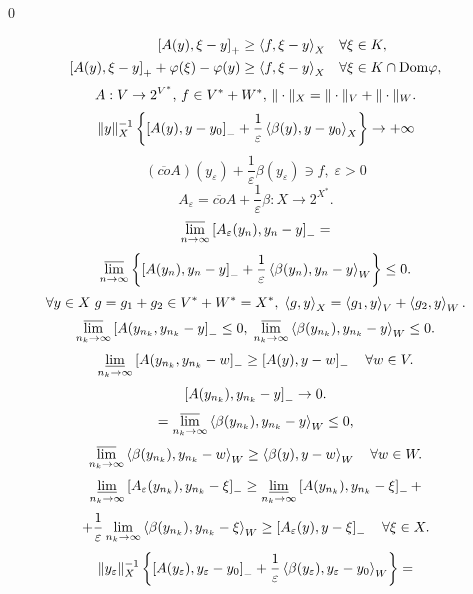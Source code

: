\documentclass[12pt]{book} %
\title{}
\author{}
\newcommand{\Dom}{\mbox{Dom}}
\let\epsilon\varepsilon
\begin{document}
\setcounter{chapter}{2}
\chapter{}
\begin{center}\qed\end{center}
\setcounter{equation}{7}
\begin{align}
	\mysbra{A(y),\xi-y}_+\geq\mysca{f}{\xi-y}_X &\quad\forall\xi\in K,\\
	\mysbra{A(y),\xi-y}_++\phi(\xi)-\phi(y)\geq\mysca{f}{\xi-y}_X &\quad\forall\xi\in K\cap\Dom\phi,
\end{align}
\[A:V\to2^{V^*},\,f\in V^*+W^*,\,\|\cdot\|_X=\|\cdot\|_V+\|\cdot\|_W.\]
\begin{equation}\mynorm{y}_X^{-1}\mycbra{\mysbra{A(y),y-y_0}_-+\frac{1}{\epsilon}\mysca{\beta(y)}{y-y_0}_X}\to+\infty\end{equation}
\begin{equation}(\overline{co}A)(y_\epsilon)+\frac{1}{\epsilon}\beta(y_\epsilon)\ni f,\;\epsilon>0\end{equation}
\[A_\epsilon=\overline{co}A+\frac{1}{\epsilon}\beta:X\to2^{X^*}.\]
\[\varlimsup_{n\to\infty}\mysbra{A_\epsilon(y_n),y_n-y}_-=\]
\[\varlimsup_{n\to\infty}\mycbra{\mysbra{A(y_n),y_n-y}_-+\frac{1}{\epsilon}\mysca{\beta(y_n)}{y_n-y}_W}\leq0.\]
\[\forall y\in X\;g=g_1+g_2\in V^*+W^*=X^*,\;\left<g,y\right>_X=\left<g_1,y\right>_V+\left<g_2,y\right>_W.\]
\begin{equation}\varlimsup_{n_k\to\infty}\left[A(y_{n_k},y_{n_k}-y\right]_-\leq0,\;\varlimsup_{n_k\to\infty}\left<\beta(y_{n_k}),y_{n_k}-y\right>_W\leq0.
\end{equation}
\begin{equation}\varliminf_{n_k\to\infty}\left[A(y_{n_k},y_{n_k}-w\right]_-\geq\left[A(y),y-w\right]_-\quad\forall w\in V.\end{equation}
	\[\left[A(y_{n_k}),y_{n_k}-y\right]_-\to0.\]
	\[=\varlimsup_{n_k\to\infty}\left<\beta(y_{n_k}),y_{n_k}-y\right>_W\leq0,\]
\begin{equation}\varlimsup_{n_k\to\infty}\left<\beta(y_{n_k}),y_{n_k}-w\right>_W\geq\left<\beta(y),y-w\right>_W\quad\forall w\in W.\end{equation}
\newcommand{\nk}{n_k}
\newcommand{\yk}{y_{n_k}}
\[\varliminf_{n_k\to\infty}\mysbra{A_\epsilon(\yk),\yk-\xi}_-\geq\varliminf_{\nk\to\infty}\mysbra{A(\yk),\yk-\xi}_-+\]
\[+\frac{1}{\epsilon}\lim_{\nk\to\infty}\mysca{\beta(\yk)}{\yk-\xi}_W\geq\mysbra{A_\epsilon(y),y-\xi}_-\quad\forall\xi\in X.\]
\[\mynorm{y_\epsilon}_X^{-1}\mycbra{\mysbra{A(y_\epsilon),y_\epsilon-y_0}_-+\frac{1}{\epsilon}\mysca{\beta(y_\epsilon)}{y_\epsilon-y_0}_W}=\]
\end{document}
